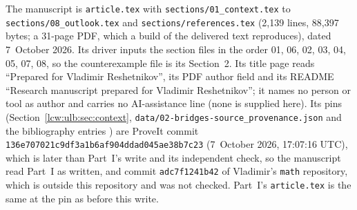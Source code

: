 \documentclass[11pt,letterpaper]{article}
\theoremstyle{remark}\newtheorem{remark}[theorem]{Remark}
\newcommand{\file}[1]{\nolinkurl{#1}}
\begin{document}
The manuscript is \file{article.tex} with \file{sections/01\_context.tex} to
\file{sections/08\_outlook.tex} and \file{sections/references.tex} (2{,}139
lines, 88{,}397 bytes; a 31-page PDF, which a build of the delivered text
reproduces), dated 7~October 2026. Its driver inputs the section files in the
order 01, 06, 02, 03, 04, 05, 07, 08, so the counterexample file is its
Section~2. Its title page reads ``Prepared for Vladimir Reshetnikov'', its PDF
author field and its README ``Research manuscript prepared for Vladimir
Reshetnikov''; it names no person or tool as author and carries no
AI-assistance line (none is supplied here). Its pins
(Section~\ref{lcw:ulb:sec:context}, \file{data/02-bridges-source\_provenance.json}
and the bibliography entries \cite{proveit,mathrepo}) are ProveIt commit
\file{136e707021c9df3a1b6af904ddad045ae38b7c23} (7~October 2026, 17:07:16
UTC), which is later than Part~I's write and its independent check, so the
manuscript read Part~I as written, and commit \file{adc7f1241b42} of
Vladimir's \texttt{math} repository, which is outside this repository and was
not checked. Part~I's \file{article.tex} is the same at the pin as before
this write.
\end{document}
